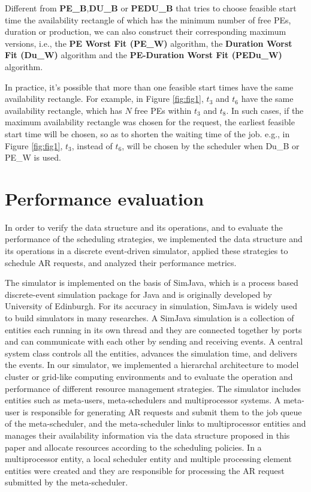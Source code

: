 \documentclass[preprint,12pt]{elsarticle}
\begin{document}
Different from \textbf{PE\_B},\textbf{DU\_B} or \textbf{PEDU\_B} that tries to choose feasible start time the availability rectangle of which has the minimum number of free PEs, duration or production, we can also construct their corresponding maximum versions, i.e., the \textbf{PE  Worst Fit (PE\_W)} algorithm, the \textbf{Duration Worst Fit (Du\_W)} algorithm and the \textbf{PE-Duration Worst Fit (PEDu\_W)} algorithm.

In practice, it's possible that more than one feasible start times have the same availability rectangle. For example, in Figure \ref{fig:fig1}, $t_3$ and $t_6$ have the same availability rectangle, which has $N$ free PEs within $t_3$ and $t_8$. In such cases, if the maximum availability rectangle was chosen for the request, the earliest feasible start time will be chosen, so as to shorten the waiting time of the job. e.g., in Figure \ref{fig:fig1}, $t_3$, instead of $t_6$, will be chosen by the scheduler when Du\_B or PE\_W is used.


\section{Performance evaluation}

In order to verify the data structure and its operations, and to evaluate the performance of the scheduling strategies, we implemented the data structure and its operations in a discrete event-driven simulator, applied these strategies to schedule AR requests, and analyzed their performance metrics.

The simulator is implemented on the basis of SimJava\cite{simjava}, which is a process based discrete-event simulation package for Java and is originally developed by University of Edinburgh. For its accuracy in simulation, SimJava is widely used to build simulators in many researches. A SimJava simulation is a collection of entities each running in its own thread and they are connected together by ports and can communicate with each other by sending and receiving events. A central system class controls all the entities, advances the simulation time, and delivers the events. In our simulator, we implemented a hierarchal architecture to model cluster or grid-like computing environments and to evaluate the operation and performance of different resource management strategies. The simulator includes entities such as meta-users, meta-schedulers and multiprocessor systems. A meta-user is responsible for generating AR requests and submit them to the job queue of the meta-scheduler, and the meta-scheduler links to multiprocessor entities and manages their availability information via the data structure proposed in this paper and allocate resources according to the scheduling policies. In a multiprocessor entity, a local scheduler entity and multiple processing element entities were created and they are responsible for processing the AR request submitted by the meta-scheduler.
\end{document}
